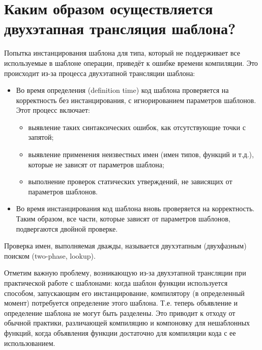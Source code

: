 \documentclass[a4paper,12pt]{article}	%
\begin{document}
\newpage

\section{Каким образом осуществляется двухэтапная трансляция шаблона?}
		
	Попытка инстанцирования шаблона для типа, который не поддерживает все используемые в шаблоне операции, приведёт к ошибке времени компиляции. Это происходит из-за процесса двухэтапной трансляции шаблона:
	
	\begin{itemize}
	
		\item Во время определения (definition time) код шаблона проверяется на корректность без инстанцирования, с игнорированием параметров шаблонов. Этот процесс включает:
		
		\begin{itemize}
		
			\item выявление таких синтаксических ошибок, как отсутствующие точки с запятой;
			
			\item выявление применения неизвестных имен (имен типов, функций и т.д.), которые не зависят от параметров шаблона;
			
			\item выполнение проверок статических утверждений, не зависящих от параметров шаблонов.		
		
		\end{itemize}
		
		\item Во время инстанцирования код шаблона вновь проверяется на корректность. Таким образом, все части, которые зависят от параметров шаблонов, подвергаются двойной проверке.
	
	\end{itemize}
	
	Проверка имен, выполняемая дважды, называется двухэтапным (двухфазным) поиском (two-phase, lookup).
	
	Отметим важную проблему, возникающую из-за двухэтапной трансляции при практической работе с шаблонами: когда шаблон функции используется способом, запускающим его инстанцирование, компилятору (в определенный момент) потребуется определение этого шаблона. Т.е. теперь объявление и определение шаблона не могут быть разделены. Это приводит к отходу от обычной практики, различающей компиляцию и компоновку для нешаблонных функций, когда объявления функции достаточно для компиляции кода с ее использованием.
	
\end{document}

